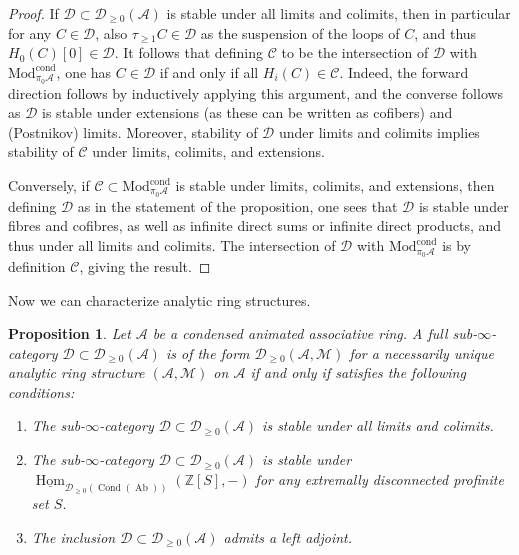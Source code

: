 \documentclass[11pt]{amsbook}
\DeclareMathOperator{\Hom}{Hom}
\newcommand{\intHom}{\underline{\Hom}}
\DeclareMathOperator{\Cond}{Cond}
\DeclareMathOperator{\Ab}{Ab}
\newcommand{\CondMod}{\mathrm{Mod}^{\mathrm{cond}}}
\numberwithin{equation}{section}
\numberwithin{theorem}{section}
\newtheorem{proposition}[theorem]{Proposition}
\theoremstyle{definition}
\begin{document}
\begin{proof} If $\mathcal D\subset \mathcal D_{\geq 0}(\mathcal A)$ is stable under all limits and colimits, then in particular for any $C\in \mathcal D$, also $\tau_{\geq 1} C\in \mathcal D$ as the suspension of the loops of $C$, and thus $H_0(C)[0]\in \mathcal D$. It follows that defining $\mathcal C$ to be the intersection of $\mathcal D$ with $\CondMod_{\pi_0\mathcal A}$, one has $C\in\mathcal D$ if and only if all $H_i(C)\in \mathcal C$. Indeed, the forward direction follows by inductively applying this argument, and the converse follows as $\mathcal D$ is stable under extensions (as these can be written as cofibers) and (Postnikov) limits. Moreover, stability of $\mathcal D$ under limits and colimits implies stability of $\mathcal C$ under limits, colimits, and extensions.

Conversely, if $\mathcal C\subset \CondMod_{\pi_0\mathcal A}$ is stable under limits, colimits, and extensions, then defining $\mathcal D$ as in the statement of the proposition, one sees that $\mathcal D$ is stable under fibres and cofibres, as well as infinite direct sums or infinite direct products, and thus under all limits and colimits. The intersection of $\mathcal D$ with $\CondMod_{\pi_0\mathcal A}$ is by definition $\mathcal C$, giving the result.
\end{proof}

Now we can characterize analytic ring structures.

\begin{proposition}\label{prop:characterizeanalyticstructure} Let $\mathcal A$ be a condensed animated associative ring. A full sub-$\infty$-category $\mathcal D\subset \mathcal D_{\geq 0}(\mathcal A)$ is of the form $\mathcal D_{\geq 0}(\mathcal A,\mathcal M)$ for a necessarily unique analytic ring structure $(\mathcal A,\mathcal M)$ on $\mathcal A$ if and only if satisfies the following conditions:
\begin{enumerate}
\item The sub-$\infty$-category $\mathcal D\subset \mathcal D_{\geq 0}(\mathcal A)$ is stable under all limits and colimits.
\item The sub-$\infty$-category $\mathcal D\subset \mathcal D_{\geq 0}(\mathcal A)$ is stable under $\intHom_{\mathcal D_{\geq 0}(\Cond(\Ab))}(\mathbb Z[S],-)$ for any extremally disconnected profinite set $S$.
\item The inclusion $\mathcal D\subset \mathcal D_{\geq 0}(\mathcal A)$ admits a left adjoint.
\end{enumerate}
\end{proposition}
\end{document}
